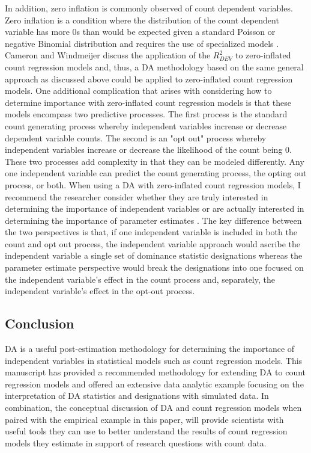 \documentclass[man]{apa7}
\begin{document}
	In addition, zero inflation is commonly observed of count dependent variables.  
	Zero inflation is a condition where the distribution of the count dependent variable has more 0s than would be expected given a standard Poisson or negative Binomial distribution and requires the use of specialized models \parencite[e.g.,][]{blevins2015count, bhaskar2023regression}. 
	Cameron and Windmeijer \parencite*{cameron1996r} discuss the application of the $R^2_{DEV}$ to zero-inflated count regression models and, thus, a DA methodology based on the same general approach as discussed above could be applied to zero-inflated count regression models.
	One additional complication that arises with considering how to determine importance with zero-inflated count regression models is that these models encompass two predictive processes. 
	The first process is the standard count generating process whereby independent variables increase or decrease dependent variable counts.
	The second is an "opt out" process whereby independent variables increase or decrease the likelihood of the count being 0.
	These two processes add complexity in that they can be modeled differently. 
	Any one independent variable can predict the count generating process, the opting out process, or both.
	When using a DA with zero-inflated count regression models, I recommend the researcher consider whether they are truly interested in determining the importance of independent variables or are actually interested in determining the importance of parameter estimates \parencite{luchman2020relative}. 
	The key difference between the two perspectives is that, if one independent variable is included in both the count and opt out process, the independent variable approach would ascribe the independent variable a single set of dominance statistic designations whereas the parameter estimate perspective would break the designations into one focused on the independent variable's effect in the count process and, separately, the independent variable's effect in the opt-out process.
	
	\subsection{Conclusion}
	
	DA is a useful post-estimation methodology for determining the importance of independent variables in statistical models such as count regression models.
	This manuscript has provided a recommended methodology for extending DA to count regression models and offered an extensive data analytic example focusing on the interpretation of DA statistics and designations with simulated data.
	In combination, the conceptual discussion of DA and count regression models when paired with the empirical example in this paper, will provide scientists with useful tools they can use to better understand the results of count regression models they estimate in support of research questions with count data.

\printbibliography
	
\end{document}
